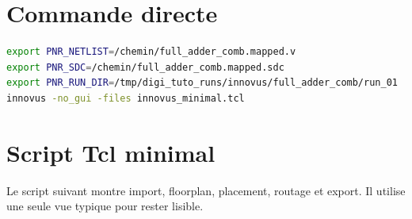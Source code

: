 \documentclass[11pt,a4paper,openany]{report}
\begin{document}
\section{Commande directe}

\begin{lstlisting}[style=guidecode,language=bash]
export PNR_NETLIST=/chemin/full_adder_comb.mapped.v
export PNR_SDC=/chemin/full_adder_comb.mapped.sdc
export PNR_RUN_DIR=/tmp/digi_tuto_runs/innovus/full_adder_comb/run_01
innovus -no_gui -files innovus_minimal.tcl
\end{lstlisting}

\section{Script Tcl minimal}

Le script suivant montre import, floorplan, placement, routage et export. Il
utilise une seule vue typique pour rester lisible.
\end{document}
